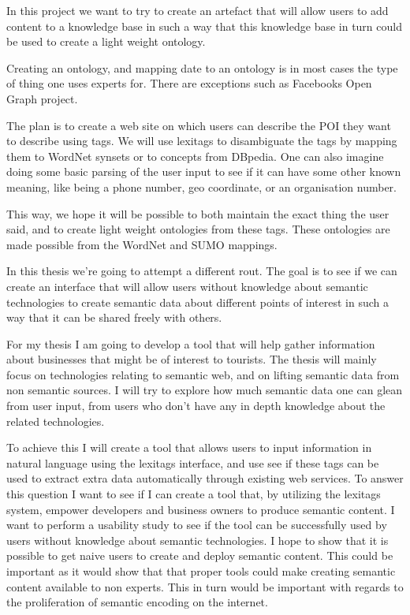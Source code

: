 In this project we want to try to create an artefact that will allow users to add content to a knowledge base in such a way that this knowledge base in turn could be used to create a light weight ontology.

Creating an ontology, and mapping date to an ontology is in most cases the type of thing one uses experts for. There are exceptions such as Facebooks Open Graph project.

The plan is to create a web site on which users can describe the POI they want to describe using tags.
We will use lexitags to disambiguate the tags by mapping them to WordNet synsets or to concepts from DBpedia. 
One can also imagine doing some basic parsing of the user input to see if it can have some other known meaning, like being a phone number, geo coordinate, or an organisation number.

This way, we hope it will be possible to both maintain the exact thing the user said, and to create light weight ontologies from these tags. 
These ontologies are made possible from the WordNet and SUMO mappings.


In this thesis we're going to attempt a different rout. 
The goal is to see if we can create an interface that will allow users without knowledge about semantic technologies to create semantic data about different points of interest in such a way that it can be shared freely with others.


For my thesis I am going to develop a tool that will help gather information about businesses that might be of interest to tourists.
The thesis will mainly focus on technologies relating to semantic web, and on lifting semantic data from non semantic sources.
I will try to explore how much semantic data one can glean from user input, from users who don't have any in depth knowledge about the related technologies.

To achieve this I will create a tool that allows users to input information in natural language using the lexitags interface, and use see if these tags can be used to extract extra data automatically through existing web services.
To answer this question I want to see if I can create a tool that, by utilizing the lexitags system, empower developers and business owners to produce semantic content. 
I want to perform a usability study to see if the tool can be successfully used by users without knowledge about semantic technologies. 
I hope to show that it is possible to get naive users to create and deploy semantic content.
This could be important as it would show that that proper tools could make creating semantic content available to non experts. This in turn would be important with regards to the proliferation of semantic encoding on the internet.
